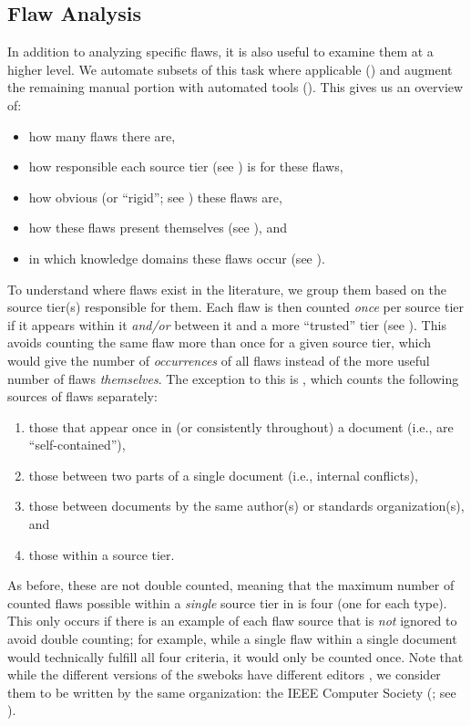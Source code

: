 \subsection{Flaw Analysis}
\label{flaw-analysis}

In addition to analyzing specific flaws, it is also useful to examine them at
a higher level. We automate subsets of this task where applicable
() and augment the remaining manual portion with
automated tools (). This gives us an overview of:
\begin{itemize}
    \item how many flaws there are,
    \item how responsible each source tier (see ) is for these flaws,
    \item how obvious (or ``rigid''; see ) these flaws are,
    \item how these flaws present themselves (see ), and
    \item in which knowledge domains these flaws occur (see ).
\end{itemize}

To understand where flaws exist in the literature, we group them based on the
source tier(s) responsible for them. Each flaw is then counted \emph{once} per
source tier if it appears within it \emph{and/or} between it and a more
``trusted'' tier (see ). This avoids counting the same flaw
more than once for a given
source tier, which would give the number of \emph{occurrences}
of all flaws instead of the more useful number of flaws \emph{themselves}. The
exception to this is , which counts the following sources
of flaws separately:
\begin{enumerate}
    \item those that appear once in (or consistently throughout) a document
          (i.e., are ``self-contained''),
    \item those between two parts of a single document
          (i.e., internal conflicts),
    \item those between documents by the same author(s) or standards
          organization(s), and
    \item those within a source tier.
\end{enumerate}
As before, these are not double counted, meaning that the maximum number of
counted flaws possible within a \emph{single} source tier in
 is four (one for each type). This only occurs if
there is an example of each flaw source that is \emph{not} ignored to
avoid double counting; for example, while a single flaw within a single
document would technically fulfill all four criteria, it would only be counted
once. Note that while the different versions of the \acfp{swebok} have
different editors \citep{SWEBOK2024,SWEBOK2014}, we consider them to be written
by the same organization: the IEEE Computer Society (\citealp{AboutSWEBOK}; see
).

